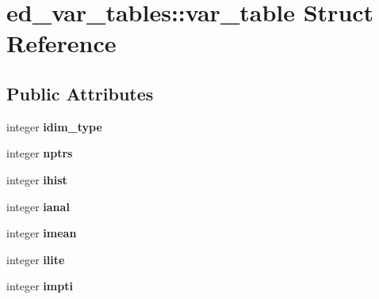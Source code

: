 \hypertarget{structed__var__tables_1_1var__table}{
\section{ed\_\-var\_\-tables::var\_\-table Struct Reference}
\label{structed__var__tables_1_1var__table}
}
\subsection*{Public Attributes}
\begin{DoxyCompactItemize}
\item 
\hypertarget{structed__var__tables_1_1var__table_a40392ffff9003585758556c63a5cb22b}{
integer {\bfseries idim\_\-type}}
\label{structed__var__tables_1_1var__table_a40392ffff9003585758556c63a5cb22b}

\item 
\hypertarget{structed__var__tables_1_1var__table_aad35a5485013e53083f97152d96dba2e}{
integer {\bfseries nptrs}}
\label{structed__var__tables_1_1var__table_aad35a5485013e53083f97152d96dba2e}

\item 
\hypertarget{structed__var__tables_1_1var__table_a5a99916b1e9adea819227a8f89c77e21}{
integer {\bfseries ihist}}
\label{structed__var__tables_1_1var__table_a5a99916b1e9adea819227a8f89c77e21}

\item 
\hypertarget{structed__var__tables_1_1var__table_a312ab422b41cea5db01740c068855330}{
integer {\bfseries ianal}}
\label{structed__var__tables_1_1var__table_a312ab422b41cea5db01740c068855330}

\item 
\hypertarget{structed__var__tables_1_1var__table_a1d8fc54f52e79fb5ecba83cfe5035e4c}{
integer {\bfseries imean}}
\label{structed__var__tables_1_1var__table_a1d8fc54f52e79fb5ecba83cfe5035e4c}

\item 
\hypertarget{structed__var__tables_1_1var__table_a9d08b584471f1ff38d27bf7d60ce6806}{
integer {\bfseries ilite}}
\label{structed__var__tables_1_1var__table_a9d08b584471f1ff38d27bf7d60ce6806}

\item 
\hypertarget{structed__var__tables_1_1var__table_a2fdbdb8888f5cc28ec6c1e1236df791d}{
integer {\bfseries impti}}
\label{structed__var__tables_1_1var__table_a2fdbdb8888f5cc28ec6c1e1236df791d}


\end{DoxyCompactItemize}
